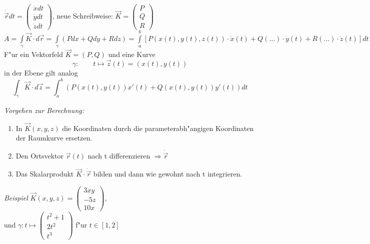 \documentclass[10pt, a4paper, twocolumn]{scrartcl}
\begin{document}
$\dot{\vec{r}}dt=
\left (
\begin{array}{c}
 \dot{x}dt\\
 \dot{y}dt\\
 \dot{z}dt
\end{array}
\right )$,
neue Schreibweise: $\vec{K}=
\left (
\begin{array}{c}
 P\\
 Q\\
 R
\end{array}
\right )
$\\

$A=\int\limits_\gamma\vec{K}\cdotp d\vec{r}=\int\limits_\gamma(Pdx+Qdy+Rdz)=\int\limits^b_a[P(x(t),y(t),z(t))\cdotp \dot{x}(t)+Q(\ldots)\cdotp\dot{y}(t)+R(\ldots)\cdotp\dot{z}(t)]dt$\\

F"ur ein Vektorfeld $\vec{K}=(P,Q)$ und eine Kurve
$$\gamma:\qquad t\mapsto \vec{z}(t)=(x(t),y(t))$$
in der Ebene gilt analog
$$\int_\gamma \vec{K}\cdotp d\vec{z}=\int^b_a(P(x(t),y(t))x'(t)+Q(x(t),y(t))y'(t))dt$$

\textit{Vorgehen zur Berechnung:}
\begin{enumerate}
 \item In $\vec{K}(x,y,z)$ die Koordinaten durch die parameterabh"angigen Koordinaten der Raumkurve ersetzen.
 \item Den Ortsvektor $\vec{r}(t)$ nach t differenzieren $\Rightarrow \dot{\vec{r}}$
 \item Das Skalarprodukt $\vec{K}\cdotp \dot{\vec{r}}$ bilden und dann wie gewohnt nach t integrieren.
\end{enumerate}

\textit{Beispiel} $\vec{K}(x,y,z)=
\left(
\begin{array}{c}
 3xy\\
 -5z\\
 10x
\end{array}\right) $,\\
und $\gamma: t\mapsto
\left(
\begin{array}{c}
 t^2+1\\
 2t^2\\
 t^3
\end{array}\right )$ f"ur $t\in[1,2]$\\
\end{document}
